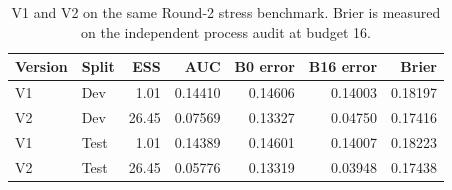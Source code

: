 \begin{table}[tbp]
\centering\small
\setlength{\tabcolsep}{4pt}
\caption{V1 and V2 on the same Round-2 stress benchmark. Brier is measured on the independent process audit at budget 16.}\label{tab:v2-overview}
\begin{tabular}{llrrrrr}
\toprule
Version & Split & ESS & AUC & B0 error & B16 error & Brier \\
\midrule
V1 & Dev & 1.01 & 0.14410 & 0.14606 & 0.14003 & 0.18197 \\
V2 & Dev & 26.45 & 0.07569 & 0.13327 & 0.04750 & 0.17416 \\
V1 & Test & 1.01 & 0.14389 & 0.14601 & 0.14007 & 0.18223 \\
V2 & Test & 26.45 & 0.05776 & 0.13319 & 0.03948 & 0.17438 \\
\bottomrule
\end{tabular}
\end{table}

